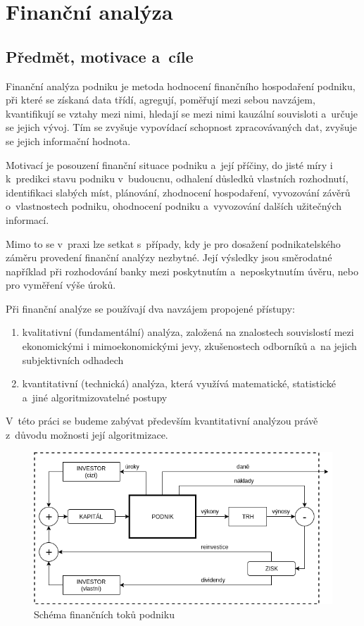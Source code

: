 \chapter{Finanční analýza}


\section{Předmět, motivace a~cíle}
Finanční analýza podniku je metoda hodnocení finančního hospodaření podniku, při které se získaná data třídí, agregují, poměřují mezi sebou navzájem, kvantifikují se vztahy mezi nimi, hledají se mezi nimi kauzální souvisloti a~určuje se jejich vývoj. Tím se zvyšuje vypovídací schopnost zpracovávaných dat, zvyšuje se jejich informační hodnota\cite{sedl}.

Motivací je posouzení finanční situace podniku a~její příčiny, do jisté míry i k~predikci stavu podniku v~budoucnu, odhalení důsledků vlastních rozhodnutí, identifikaci slabých míst, plánování, zhodnocení hospodaření, vyvozování závěrů o~vlastnostech podniku, ohodnocení podniku a~vyvozování dalších užitečných informací.

Mimo to se v~praxi lze setkat s~případy, kdy je pro dosažení podnikatelského záměru provedení finanční analýzy nezbytné. Její výsledky jsou směrodatné například při rozhodování banky mezi poskytnutím a~neposkytnutím úvěru, nebo pro vyměření výše úroků.

Při finanční analýze se používají dva navzájem propojené přístupy\cite{kova}:
\begin{enumerate}
	\item kvalitativní (fundamentální) analýza, založená na znalostech souvislostí mezi ekonomickými i mimoekonomickými jevy, zkušenostech odborníků a~na jejich subjektivních odhadech
	\item kvantitativní (technická) analýza, která využívá matematické, statistické a~jiné algoritmizovatelné postupy
\end{enumerate}

V~této práci se budeme zabývat především kvantitativní analýzou právě z~důvodu možnosti její algoritmizace.


\begin{figure}
  \centering
  \includegraphics[width=14cm]{img/ccf.png}
  \caption{Schéma finančních toků podniku \cite{sedl}}
  \label{ccf}
\end{figure}

